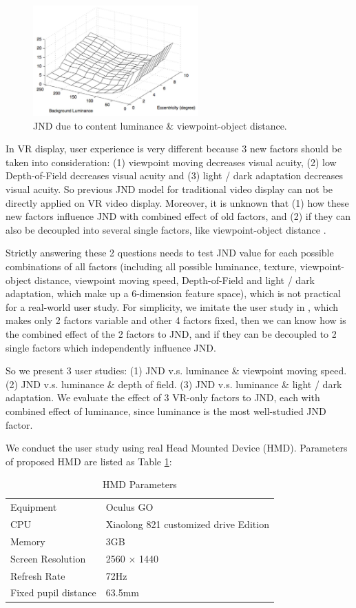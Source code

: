 \begin{figure}
  \centering
  \includegraphics[width=2.5in]{images/JNDlum-dist.jpg}
  \caption{JND due to content luminance \& viewpoint-object distance.}
  \label{JNDlum-dist}
  \end{figure}

In VR display, user experience is very different because 3 new factors should be taken into consideration: (1) viewpoint moving decreases visual acuity, (2) low Depth-of-Field decreases visual acuity and (3) light / dark adaptation decreases visual acuity. So previous JND model for traditional video display can not be directly applied on VR video display. Moreover, it is unknown that (1) how these new factors influence JND with combined effect of old factors, and (2) if they can also be decoupled into several single factors, like viewpoint-object distance \cite{distance}.

Strictly answering these 2 questions needs to test JND value for each possible combinations of all factors (including all possible luminance, texture, viewpoint-object distance, viewpoint moving speed, Depth-of-Field and light / dark adaptation, which make up a 6-dimension feature space), which is not practical for a real-world user study. For simplicity, we imitate the user study in \cite{distance}, which makes only 2 factors variable and other 4 factors fixed, then we can know how is the combined effect of the 2 factors to JND, and if they can be decoupled to 2 single factors which independently influence JND.

So we present 3 user studies: (1) JND v.s. luminance \& viewpoint moving speed. (2) JND v.s. luminance \& depth of field. (3) JND v.s. luminance \& light / dark adaptation. We evaluate the effect of 3 VR-only factors to JND, each with combined effect of luminance, since luminance is the most well-studied JND factor.

We conduct the user study using real Head Mounted Device (HMD). Parameters of proposed HMD are listed as Table \ref{table1}:

\begin{table}[h]
\centering
\caption{HMD Parameters}\label{table1}
\begin{tabular}{|p{3.5cm}|p{3.5cm}|}
\hline
Equipment & Oculus GO\\
CPU & Xiaolong 821 customized drive Edition\\
Memory & 3GB\\
Screen Resolution & 2560 $\times$ 1440\\
Refresh Rate & 72Hz\\
Fixed pupil distance & 63.5mm\\
\hline
\end{tabular}
\end{table}

